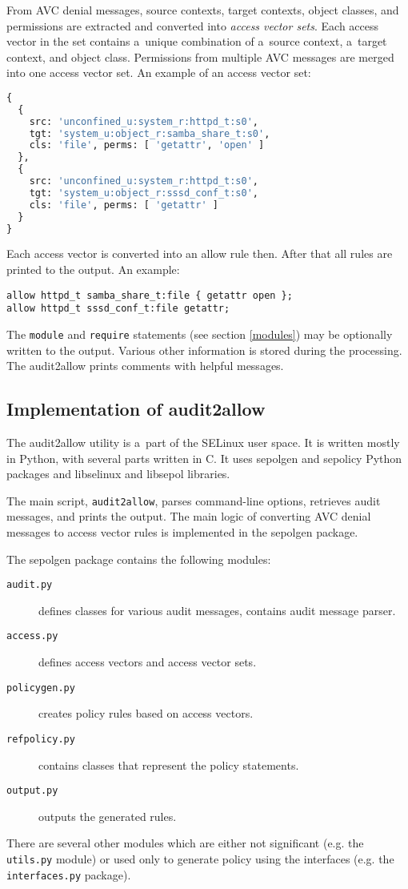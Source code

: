 From AVC denial messages, source contexts, target contexts, object classes, and
permissions are extracted and converted into \emph{access vector sets}. Each
access vector in the set contains a~unique combination of a~source context,
a~target context, and object class. Permissions from multiple AVC messages are
merged into one access vector set. An example of an access vector set:
\begin{lstlisting}[language=Python]
{
  {
    src: 'unconfined_u:system_r:httpd_t:s0',
    tgt: 'system_u:object_r:samba_share_t:s0',
    cls: 'file', perms: [ 'getattr', 'open' ]
  },
  {
    src: 'unconfined_u:system_r:httpd_t:s0',
    tgt: 'system_u:object_r:sssd_conf_t:s0',
    cls: 'file', perms: [ 'getattr' ]
  }
}
\end{lstlisting}

Each access vector is converted into an allow rule then. After that all rules
are printed to the output. An example:
\begin{lstlisting}
allow httpd_t samba_share_t:file { getattr open };
allow httpd_t sssd_conf_t:file getattr;
\end{lstlisting}
The \texttt{module} and \texttt{require} statements (see section \ref{modules})
may be optionally written to the output. Various other information is stored
during the processing. The audit2allow prints comments with helpful messages.

\subsection{Implementation of audit2allow}
\label{implementation}
The audit2allow utility is a~part of the SELinux user space. It is written mostly
in Python, with several parts written in C. It uses sepolgen and sepolicy Python
packages and libselinux and libsepol libraries.

The main script, \texttt{audit2allow}, parses command-line options, retrieves
audit messages, and prints the output. The main logic of converting AVC denial
messages to access vector rules is implemented in the sepolgen package.

The sepolgen package contains the following modules:
\begin{description}
    \item [\texttt{audit.py}] defines classes for various audit messages,
        contains audit message parser.
    \item [\texttt{access.py}] defines access vectors and access vector sets.
    \item [\texttt{policygen.py}] creates policy rules based on access vectors.
    \item [\texttt{refpolicy.py}] contains classes that represent the policy
        statements.
    \item [\texttt{output.py}] outputs the generated rules.
\end{description}
There are several other modules which are either not significant (e.g. the
\texttt{utils.py} module) or used only to generate policy using the interfaces
(e.g. the \texttt{interfaces.py} package).

